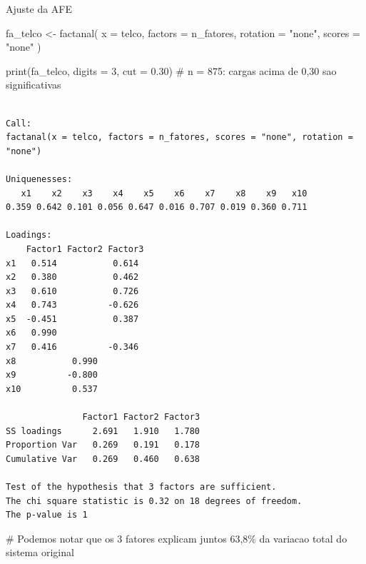 \documentclass[
  ignorenonframetext,
  aspectratio=169,
]{beamer}
\newenvironment{Shaded}{\begin{snugshade}}{\end{snugshade}}
\newcommand{\AttributeTok}[1]{\textcolor[rgb]{0.40,0.45,0.13}{#1}}
\newcommand{\CommentTok}[1]{\textcolor[rgb]{0.37,0.37,0.37}{#1}}
\newcommand{\DecValTok}[1]{\textcolor[rgb]{0.68,0.00,0.00}{#1}}
\newcommand{\FloatTok}[1]{\textcolor[rgb]{0.68,0.00,0.00}{#1}}
\newcommand{\FunctionTok}[1]{\textcolor[rgb]{0.28,0.35,0.67}{#1}}
\newcommand{\NormalTok}[1]{\textcolor[rgb]{0.00,0.23,0.31}{#1}}
\newcommand{\OtherTok}[1]{\textcolor[rgb]{0.00,0.23,0.31}{#1}}
\newcommand{\StringTok}[1]{\textcolor[rgb]{0.13,0.47,0.30}{#1}}
\begin{document}
\begin{frame}[fragile]{Ajuste da AFE}
\label{ajuste-da-afe}
\begin{Shaded}
\begin{Highlighting}[]
\NormalTok{fa\_telco }\OtherTok{\textless{}{-}} \FunctionTok{factanal}\NormalTok{(}
  \AttributeTok{x        =}\NormalTok{ telco,}
  \AttributeTok{factors  =}\NormalTok{ n\_fatores,}
  \AttributeTok{rotation =} \StringTok{"none"}\NormalTok{,}
  \AttributeTok{scores   =} \StringTok{"none"}
\NormalTok{)}

\FunctionTok{print}\NormalTok{(fa\_telco, }\AttributeTok{digits =} \DecValTok{3}\NormalTok{, }\AttributeTok{cut =} \FloatTok{0.30}\NormalTok{) }\CommentTok{\# n = 875: cargas acima de 0,30 sao significativas}
\end{Highlighting}
\end{Shaded}

\begin{verbatim}

Call:
factanal(x = telco, factors = n_fatores, scores = "none", rotation = "none")

Uniquenesses:
   x1    x2    x3    x4    x5    x6    x7    x8    x9   x10 
0.359 0.642 0.101 0.056 0.647 0.016 0.707 0.019 0.360 0.711 

Loadings:
    Factor1 Factor2 Factor3
x1   0.514           0.614 
x2   0.380           0.462 
x3   0.610           0.726 
x4   0.743          -0.626 
x5  -0.451           0.387 
x6   0.990                 
x7   0.416          -0.346 
x8           0.990         
x9          -0.800         
x10          0.537         

               Factor1 Factor2 Factor3
SS loadings      2.691   1.910   1.780
Proportion Var   0.269   0.191   0.178
Cumulative Var   0.269   0.460   0.638

Test of the hypothesis that 3 factors are sufficient.
The chi square statistic is 0.32 on 18 degrees of freedom.
The p-value is 1 
\end{verbatim}

\begin{Shaded}
\begin{Highlighting}[]
\CommentTok{\# Podemos notar que os 3 fatores explicam juntos 63,8\% da variacao total do sistema original}
\end{Highlighting}
\end{Shaded}
\end{frame}
\end{document}
